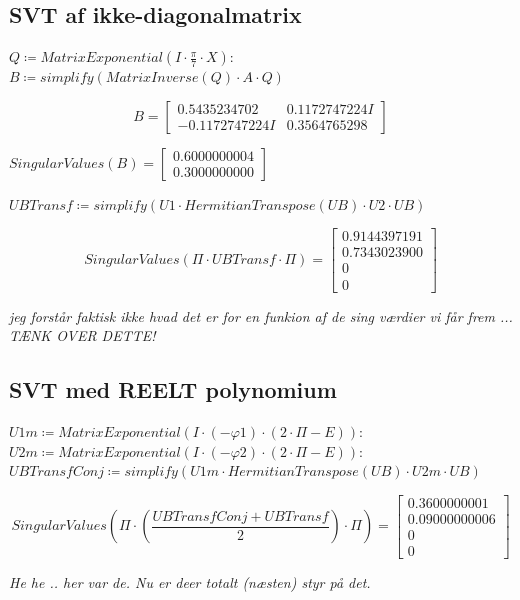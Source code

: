 \documentclass[11pt,a4paper]{article}
\begin{document}
\subsection*{SVT af ikke-diagonalmatrix}

$Q \coloneqq MatrixExponential(I \cdot \frac{\pi}{7} \cdot X) :$ \\
$B \coloneqq simplify(MatrixInverse(Q) \cdot A \cdot Q)$

\begin{equation}
B = \begin{bmatrix} 0.5435234702 & 0.1172747224I \\ -0.1172747224I & 0.3564765298 \end{bmatrix}
\end{equation}

$SingularValues(B) = \begin{bmatrix} 0.6000000004 \\ 0.3000000000 \end{bmatrix}$

$UBTransf \coloneqq simplify(U1 \cdot HermitianTranspose(UB) \cdot U2 \cdot UB)$

\begin{equation}
SingularValues(\Pi \cdot UBTransf \cdot \Pi) = \begin{bmatrix} 0.9144397191 \\ 0.7343023900 \\ 0 \\ 0 \end{bmatrix}
\end{equation}

\textit{jeg forstår faktisk ikke hvad det er for en funkion af de sing værdier vi får frem ... TÆNK OVER DETTE!}

\subsection*{SVT med REELT polynomium}

$U1m \coloneqq MatrixExponential(I \cdot (-\varphi1) \cdot (2\cdot\Pi - E)) :$ \\
$U2m \coloneqq MatrixExponential(I \cdot (-\varphi2) \cdot (2\cdot\Pi - E)) :$ \\
$UBTransfConj \coloneqq simplify(U1m \cdot HermitianTranspose(UB) \cdot U2m \cdot UB)$

\begin{equation}
SingularValues\left( \Pi \cdot \left( \frac{UBTransfConj + UBTransf}{2} \right) \cdot \Pi \right) = \begin{bmatrix} 0.3600000001 \\ 0.09000000006 \\ 0 \\ 0 \end{bmatrix}
\end{equation}

\textit{He he .. her var de. Nu er deer totalt (næsten) styr på det.}
\end{document}
